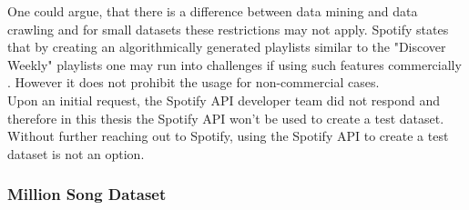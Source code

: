 One could argue, that there is a difference between data mining and data crawling and for small datasets these restrictions may not apply.
Spotify states that by creating an algorithmically generated playlists similar to the "Discover Weekly" playlists one may run into challenges if using such features commercially \cite{spottac3}. However it does not prohibit the usage for non-commercial cases.\\ 
Upon an initial request, the Spotify API developer team did not respond and therefore in this thesis the Spotify API won't be used to create a test dataset. Without further reaching out to Spotify, using the Spotify API to create a test dataset is not an option. 

\subsubsection{Million Song Dataset}

